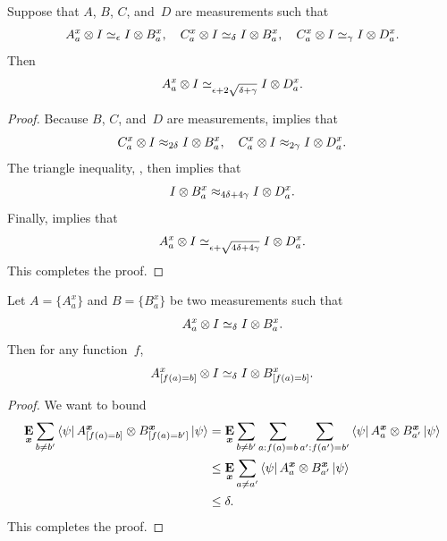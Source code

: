\begin{proposition}\label{prop:simeq-triangle-inequality}
		Suppose that $A$, $B$, $C$, and~$D$ are measurements such that
		\begin{equation*}
		A^x_a \otimes I \simeq_{\epsilon} I \otimes B^x_a,
		\quad
		C^x_a \otimes I \simeq_{\delta} I \otimes B^x_a,
		\quad
		C^x_a \otimes I \simeq_{\gamma} I \otimes D^x_a.
		\end{equation*}
		Then
		\begin{equation*}
		A^x_a \otimes I \simeq_{\epsilon + 2\sqrt{\delta + \gamma}} I \otimes D^x_a.
		\end{equation*}
		\end{proposition}
\begin{proof}
Because $B$, $C$, and~$D$ are measurements,  implies that
\begin{equation*}
C^x_a \otimes I \approx_{2\delta} I \otimes B^x_a,
\quad
C^x_a \otimes I \approx_{2\gamma} I \otimes D^x_a.
\end{equation*}
The triangle inequality, , then implies that
\begin{equation*}
I \otimes B^x_a \approx_{4 \delta + 4 \gamma} I \otimes D^x_a.
\end{equation*}
Finally,  implies that
\begin{equation*}
A^x_a \otimes I
\simeq_{\epsilon + \sqrt{4 \delta + 4 \gamma}} I \otimes D^x_a.
\end{equation*}
This completes the proof.
\end{proof}

\begin{proposition}
\label{prop:simeq-data-processing}
Let $A = \{A^x_a\}$ and $B = \{B^x_a\}$ be two measurements such that
\begin{equation*}
A^x_a \otimes I \simeq_{\delta} I \otimes B^x_a.
\end{equation*}
Then for any function~$f$,
\begin{equation*}
A^x_{[f(a)=b]} \otimes I \simeq_{\delta} I \otimes B^x_{[f(a)=b]}.
\end{equation*}
\end{proposition}
\begin{proof}
We want to bound
\begin{align*}
\mathop{\bf E\/}_{{\boldsymbol{x}}} \sum_{b \neq b'} \bra{\psi} A^{{\boldsymbol{x}}}_{[f(a)=b]} \otimes B^{{\boldsymbol{x}}}_{[f(a)=b']}\ket{\psi}
& = \mathop{\bf E\/}_{{\boldsymbol{x}}} \sum_{b \neq b'} \sum_{a: f(a) = b} \sum_{a': f(a') = b'} \bra{\psi} A^{{\boldsymbol{x}}}_{a} \otimes B^{{\boldsymbol{x}}}_{a'}\ket{\psi}\\
& \leq \mathop{\bf E\/}_{{\boldsymbol{x}}} \sum_{a \neq a'} \bra{\psi} A^{{\boldsymbol{x}}}_{a} \otimes B^{{\boldsymbol{x}}}_{a'}\ket{\psi}\\
& \leq \delta.
\end{align*}
This completes the proof.
\end{proof}
    

